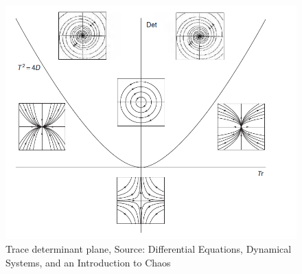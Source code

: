 \begin{figure}[ht]
    \centering
    \includegraphics[scale=0.7]{Images/trace_det_plane.png}
    \caption{Trace determinant plane, Source: Differential Equations, Dynamical Systems, and an Introduction to Chaos}
    \label{fig:trace-det-plane}
\end{figure}



